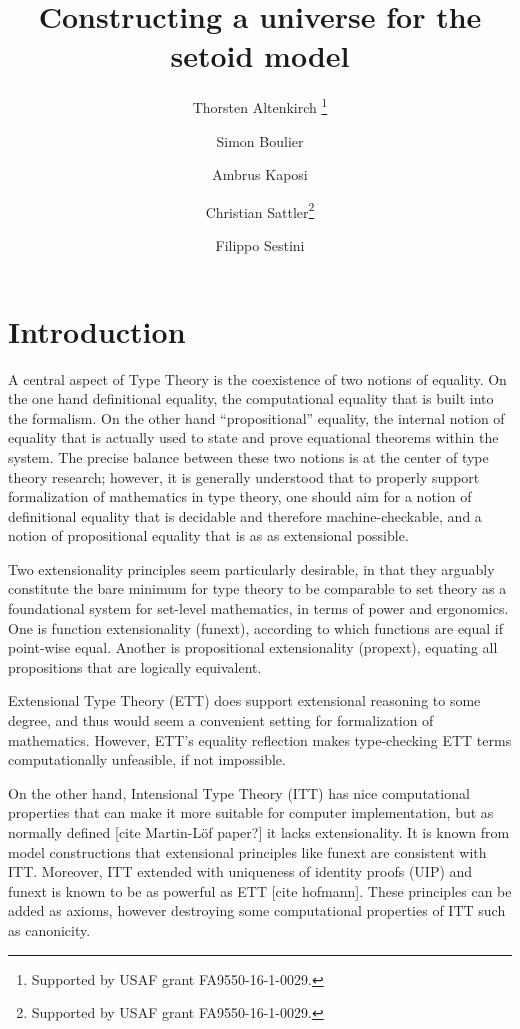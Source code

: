 \documentclass{easychair}
\title{Constructing a universe for the setoid model}
\author{
  Thorsten Altenkirch \inst{1}\thanks{Supported by USAF grant FA9550-16-1-0029.}
\and
  Simon Boulier
\and
  Ambrus Kaposi \inst{2}
\and
  Christian Sattler\inst{1}\thanks{Supported by USAF grant FA9550-16-1-0029.}
\and
  Filippo Sestini\inst{1}
}
\institute{
  School of Computer Science, University of Nottingham, UK\\
  \email{\{psztxa,pszcs1,psxfs5\}@nottingham.ac.uk}
  \and
  E{\"o}tv{\"o}s Lor{\'a}nd University, Budapest, Hungary\\
  \email{akaposi@inf.elte.hu}
}
\begin{document}
\maketitle

\section{Introduction}

A central aspect of Type Theory is the coexistence of two notions of
equality. On the one hand definitional equality, the computational equality that
is built into the formalism. On the other hand ``propositional'' equality, the
internal notion of equality that is actually used to state and prove equational
theorems within the system. The precise balance between these two notions is at
the center of type theory research; however, it is generally understood that to
properly support formalization of mathematics in type theory, one should aim for
a notion of definitional equality that is decidable and therefore
machine-checkable, and a notion of propositional equality that is as as
extensional possible.

Two extensionality principles seem particularly desirable, in that they arguably
constitute the bare minimum for type theory to be comparable to set theory as a
foundational system for set-level mathematics, in terms of power and ergonomics.
One is function extensionality (funext), according to which functions are equal
if point-wise equal. Another is propositional extensionality (propext), equating
all propositions that are logically equivalent.

Extensional Type Theory (ETT) does support extensional reasoning to some degree,
and thus would seem a convenient setting for formalization of
mathematics. However, ETT's equality reflection makes type-checking ETT terms
computationally unfeasible, if not impossible.

On the other hand, Intensional Type Theory (ITT) has nice computational
properties that can make it more suitable for computer implementation, but as
normally defined [cite Martin-L\"of paper?] it lacks extensionality.
%
It is known from model constructions that extensional principles like funext are
consistent with ITT.
%
Moreover, ITT extended with uniqueness of identity proofs (UIP) and funext is
known to be as powerful as ETT [cite hofmann]. These principles can be added as
axioms, however destroying some computational properties of ITT such as
canonicity.
\end{document}
